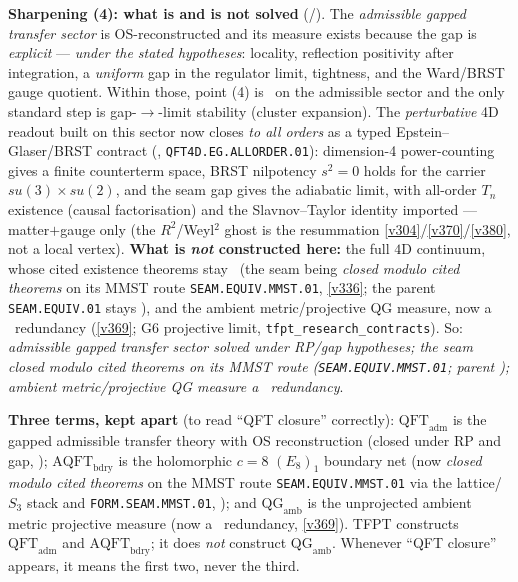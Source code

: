\documentclass[11pt,a4paper]{article}
\theoremstyle{definition}
\begin{document}
\par\smallskip\noindent\textbf{Sharpening (4): what is and is not solved} (\mE/\mC).
The \emph{admissible gapped transfer sector} is OS-reconstructed and its measure exists because the gap is
\emph{explicit} --- \emph{under the stated hypotheses}: locality, reflection positivity after integration, a
\emph{uniform} gap in the regulator limit, tightness, and the Ward/BRST gauge quotient. Within those, point
(4) is \mE\ on the admissible sector and the only standard step is gap-$\to$-limit stability (cluster
expansion). The \emph{perturbative} 4D readout built on this sector now closes \emph{to all orders} as a typed
Epstein--Glaser/BRST contract (, \texttt{QFT4D.EG.ALLORDER.01}): dimension-4
power-counting gives a finite counterterm space, BRST nilpotency $s^2{=}0$ holds for the carrier $su(3){\times}su(2)$,
and the seam gap gives the adiabatic limit, with all-order $T_n$ existence (causal factorisation) and the
Slavnov--Taylor identity imported --- matter$+$gauge only (the $R^2$/Weyl$^2$ ghost is the resummation
\vref{v304}/\vref{v370}/\vref{v380}, not a local vertex). \textbf{What is \emph{not} constructed here:} the full $4$D continuum, whose cited existence theorems
stay \mO\ (the seam being \emph{closed modulo cited theorems} on its MMST route \texttt{SEAM.EQUIV.MMST.01}, \vref{v336}; the parent \texttt{SEAM.EQUIV.01} stays \mO), and the ambient metric/projective QG
measure, now a \mC\ redundancy (\vref{v369}; G6 projective limit, \texttt{tfpt\_research\_contracts}).
So: \emph{admissible gapped transfer sector solved under RP/gap hypotheses; the seam closed modulo cited theorems on
its MMST route (\texttt{SEAM.EQUIV.MMST.01}; parent \mO);
ambient metric/projective QG measure a \mC\ redundancy}.
\par\smallskip\noindent\textbf{Three terms, kept apart} (to read ``QFT closure'' correctly): $\mathrm{QFT}_{\mathrm{adm}}$
is the gapped admissible transfer theory with OS reconstruction (closed under RP and gap, \mE);
$\mathrm{AQFT}_{\mathrm{bdry}}$ is the holomorphic $c=8$ $(E_8)_1$ boundary net (now \emph{closed modulo cited
theorems} on the MMST route \texttt{SEAM.EQUIV.MMST.01} via the lattice/$S_3$ stack and \texttt{FORM.SEAM.MMST.01}, \mC); and $\mathrm{QG}_{\mathrm{amb}}$ is the
unprojected ambient metric projective measure (now a \mC\ redundancy, \vref{v369}). TFPT constructs $\mathrm{QFT}_{\mathrm{adm}}$ and
$\mathrm{AQFT}_{\mathrm{bdry}}$; it does \emph{not} construct $\mathrm{QG}_{\mathrm{amb}}$. Whenever ``QFT
closure'' appears, it means the first two, never the third.
\end{document}
